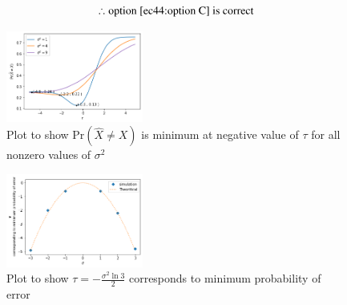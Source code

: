 \[\therefore \text{option \ref{ec44:option C} is correct}\]
%
\newpage
\begin{figure}[h!]
    \centering
    \includegraphics[width=0.4\textwidth]{solutions/ec/44/figures/fig-errorVstau}
    \caption{Plot to show Pr$ \left( \hat{X} \neq X \right)$ is minimum at negative value of $\tau$ for all nonzero values of $\sigma^2$}
    \label{ec44:fig:errorVstau}
\end{figure}
\newpage
\begin{figure}[h!]
    \centering
    \includegraphics[width=0.4\textwidth]{solutions/ec/44/figures/fig-tauVssigma}
    \caption{Plot to show $\tau=-\frac{\sigma^2 \ln{3}}{2}$ corresponds to minimum probability of error}
    \label{ec44:fig:my_label}
\end{figure}
